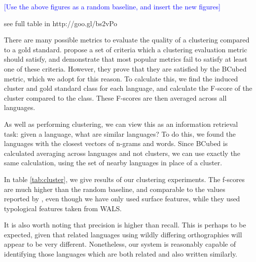 \textcolor{blue}{[Use the above figures as a random baseline, and insert the new figures]}


\noindent
see full table in http://goo.gl/bs2vPo





There are many possible metrics to evaluate the quality of a clustering compared to a gold standard.  propose a set of criteria which a clustering evaluation metric should satisfy, and demonstrate that most popular metrics fail to satisfy at least one of these criteria.  However, they prove that they are satisfied by the BCubed metric, which we adopt for this reason.  To calculate this, we find the induced cluster and gold standard class for each language, and calculate the F-score of the cluster compared to the class.  These F-scores are then averaged across all languages.

As well as performing clustering, we can view this as an information retrieval task: given a language, what are similar languages?  To do this, we found the languages with the closest vectors of n-grams and words.  Since BCubed is calculated averaging across languages and not clusters, we can use exactly the same calculation, using the set of nearby languages in place of a cluster.

In table \ref{tab:cluster}, we give results of our clustering experiments.  The f-scores are much higher than the random baseline, and comparable to the values reported by , even though we have only used surface features, while they used typological features taken from WALS.

It is also worth noting that precision is higher than recall.  This is perhaps to be expected, given that related languages using wildly differing orthographies will appear to be very different.  Nonetheless, our system is reasonably capable of identifying those languages which are both related and also written similarly.
